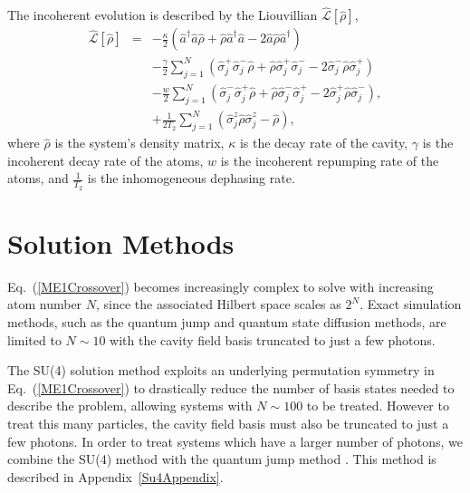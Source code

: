 \documentclass[aps,
twocolumn,
superscriptaddress,groupedaddress]{revtex4}
\begin{document}
The incoherent evolution is described by the Liouvillian
$\hat{\mathcal{L}}\left[ \hat{\rho} \right]$,
\begin{eqnarray}
\hat{\mathcal{L}}\left[ \hat{\rho} \right] &=&
  -\frac{\kappa}{2}
  \left(
    \hat{a}^{\dagger} \hat{a} \hat{\rho}
    + \hat{\rho}  \hat{a}^{\dagger} \hat{a}
    - 2\hat{a} \hat{\rho} \hat{a}^{\dagger}
  \right)
\nonumber
\\
 &&-\frac{\gamma}{2} \sum_{j=1}^N
  \left(
   \hat{\sigma}_{j}^{+} \hat{\sigma}_{j}^{-} \hat{\rho}
   + \hat{\rho} \hat{\sigma}_{j}^{+} \hat{\sigma}_{j}^{-}
   - 2\hat{\sigma}_{j}^{-} \hat{\rho} \hat{\sigma}_{j}^{+}
  \right)
\nonumber
\\
 &&-\frac{w}{2} \sum_{j=1}^N
  \left(
   \hat{\sigma}_{j}^{-} \hat{\sigma}_{j}^{+} \hat{\rho}
   + \hat{\rho} \hat{\sigma}_{j}^{-} \hat{\sigma}_{j}^{+}
   - 2\hat{\sigma}_{j}^{+} \hat{\rho}  \hat{\sigma}_{j}^{-}
  \right),
\nonumber
\\
 &&+\frac{1}{2T_2} \sum_{j=1}^N
  \left(
   \hat{\sigma}_{j}^{z} \hat{\rho}  \hat{\sigma}_{j}^{z} - \hat{\rho}
  \right),
\end{eqnarray}
where $\hat{\rho}$ is the system's density matrix, $\kappa$ is the decay
rate of the cavity, $\gamma$ is the incoherent decay rate of the atoms,
$w$ is the incoherent repumping rate of the atoms, and $\frac{1}{T_2}$
is the inhomogeneous dephasing rate.

\section{Solution Methods}
\label{sec:Methods}

Eq.~(\ref{ME1Crossover}) becomes increasingly complex to solve with increasing
atom number $N$, since the associated Hilbert space scales as $2^N$.
Exact simulation methods, such as the quantum jump and quantum state
diffusion methods, are limited to $N\sim10$ with the cavity field basis
truncated to just a few photons.

The SU(4) solution method \cite{Hartmann:arXiv1201.1732}
\cite{PhysRevA.87.062101} exploits an underlying permutation symmetry in
Eq.~(\ref{ME1Crossover}) to drastically reduce the number of basis
states needed to describe the problem, allowing systems with
$N\sim100$ to be treated. However to treat this many particles, the
cavity field basis must also be truncated to just a few photons. In
order to treat systems which have a larger number of photons, we
combine the SU(4) method with the quantum jump method
\cite{Dalibard92} \cite{Dum92} \cite{Knight98}. This method is described in Appendix~\ref{Su4Appendix}.
\end{document}
